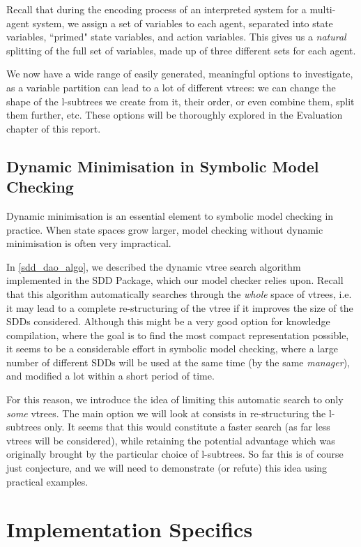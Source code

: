 \documentclass[11pt]{report}
\begin{document}
Recall that during the encoding process of an interpreted system for a multi-agent system, we assign a set of variables to each agent, separated into state variables, ``primed" state variables, and action variables. This gives us a \textit{natural} splitting of the full set of variables, made up of three different sets for each agent.

We now have a wide range of easily generated, meaningful options to investigate, as a variable partition can lead to a lot of different vtrees: we can change the shape of the l-subtrees we create from it, their order, or even combine them, split them further, etc. These options will be thoroughly explored in the Evaluation chapter of this report. 

\subsection{Dynamic Minimisation in Symbolic Model Checking}
\label{dynamic_with_sdds}
Dynamic minimisation is an essential element to symbolic model checking in practice. When state spaces grow larger, model checking without dynamic minimisation is often very impractical. 

In \ref{sdd_dao_algo}, we described the dynamic vtree search algorithm implemented in the SDD Package, which our model checker relies upon. Recall that this algorithm automatically searches through the \textit{whole} space of vtrees, i.e. it may lead to a complete re-structuring of the vtree if it improves the size of the SDDs considered. Although this might be a very good option for knowledge compilation, where the goal is to find the most compact representation possible, it seems to be a considerable effort in symbolic model checking, where a large number of different SDDs will be used at the same time (by the same \textit{manager}), and modified a lot within a short period of time.

For this reason, we introduce the idea of limiting this automatic search to only \textit{some} vtrees. The main option we will look at consists in re-structuring the l-subtrees only. It seems that this would constitute a faster search (as far less vtrees will be considered), while retaining the potential advantage which was originally brought by the particular choice of l-subtrees. So far this is of course just conjecture, and we will need to demonstrate (or refute) this idea using practical examples.


\section{Implementation Specifics}
\end{document}
